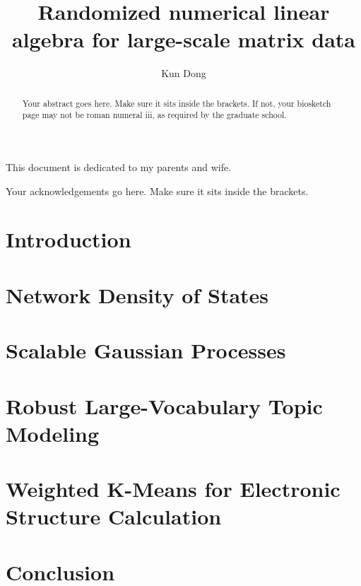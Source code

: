 \documentclass[phd,tocprelim]{cornell}
\title {Randomized numerical linear algebra for large-scale matrix data}
\author {Kun Dong}
\begin{document}
\maketitle
\makecopyright

\begin{abstract}
Your abstract goes here. Make sure it sits inside the brackets. If not,
your biosketch page may not be roman numeral iii, as required by the
graduate school.
\end{abstract}

\begin{biosketch}
  
\end{biosketch}

\begin{dedication}
This document is dedicated to my parents and wife.
\end{dedication}

\begin{acknowledgements}
Your acknowledgements go here. Make sure it sits inside the brackets.
\end{acknowledgements}

\contentspage
\tablelistpage
\figurelistpage

\normalspacing \setcounter{page}{1} 
\pagestyle{cornell} \addtolength{\parskip}{0.5\baselineskip}

\chapter{Introduction}
	\label{ch1}
	

\chapter{Network Density of States}
	\label{ch2}
	

\chapter{Scalable Gaussian Processes}
	\label{ch3}
	

\chapter{Robust Large-Vocabulary Topic Modeling}
	\label{ch4}
	

\chapter{Weighted K-Means for Electronic Structure Calculation}
	\label{ch5}
	

\chapter{Conclusion}
	\label{ch6}
	




\end{document}
